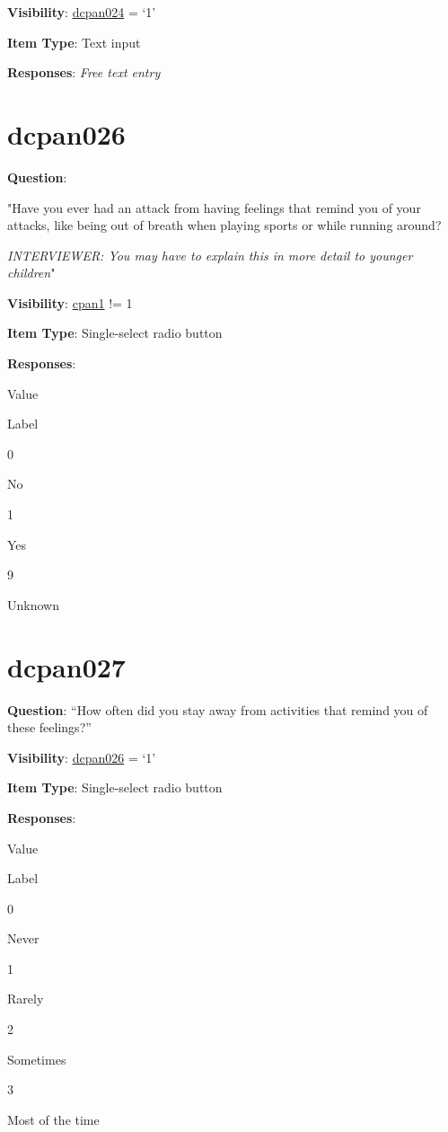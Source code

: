\documentclass[]{book}
\begin{document}
\textbf{Visibility}: \protect\hyperlink{dcpan024}{dcpan024} = `1'

\textbf{Item Type}: Text input

\textbf{Responses}: \emph{Free text entry}

\hypertarget{dcpan026}{%
\section{dcpan026}\label{dcpan026}}

\textbf{Question}:

"Have you ever had an attack from having feelings that remind you of your attacks, like being out of breath when playing sports or while running around?

\emph{INTERVIEWER: You may have to explain this in more detail to younger children}"

\textbf{Visibility}: \protect\hyperlink{cpan1}{cpan1} != 1

\textbf{Item Type}: Single-select radio button

\textbf{Responses}:

Value

Label

0

No

1

Yes

9

Unknown

\hypertarget{dcpan027}{%
\section{dcpan027}\label{dcpan027}}

\textbf{Question}: ``How often did you stay away from activities that remind you of these feelings?''

\textbf{Visibility}: \protect\hyperlink{dcpan026}{dcpan026} = `1'

\textbf{Item Type}: Single-select radio button

\textbf{Responses}:

Value

Label

0

Never

1

Rarely

2

Sometimes

3

Most of the time
\end{document}
